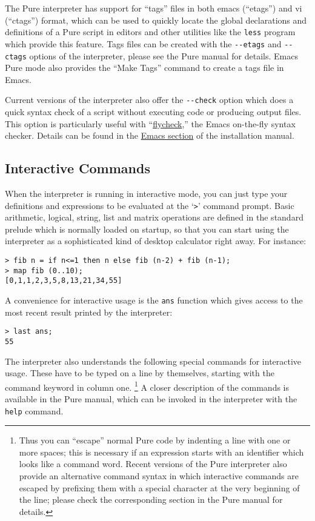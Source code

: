 \documentclass[a4paper,12pt]{article}
\begin{document}
The Pure interpreter has support for ``tags'' files in both emacs (``etags'') and vi (``ctags'') format, which can be used to quickly locate the global declarations and definitions of a Pure script in editors and other utilities like the \verb|less| program which provide this feature. Tags files can be created with the \verb|--etags| and \verb|--ctags| options of the interpreter, please see the Pure manual for details. Emacs Pure mode also provides the ``Make Tags'' command to create a tags file in Emacs.

Current versions of the interpreter also offer the \verb|--check| option which does a quick syntax check of a script without executing code or producing output files. This option is particularly useful with ``\href{http://www.flycheck.org/}{flycheck},'' the Emacs on-the-fly syntax checker. Details can be found in the \href{https://agraef.github.io/pure-docs/install.html#emacs-pure-mode}{Emacs section} of the installation manual.

\subsection{Interactive Commands}
\label{Interactive}

When the interpreter is running in interactive mode, you can just type your definitions and expressions to be evaluated at the `\verb|>|' command prompt. Basic arithmetic, logical, string, list and matrix operations are defined in the standard prelude which is normally loaded on startup, so that you can start using the interpreter as a sophisticated kind of desktop calculator right away. For instance:

\begin{lstlisting}
> fib n = if n<=1 then n else fib (n-2) + fib (n-1);
> map fib (0..10);
[0,1,1,2,3,5,8,13,21,34,55]
\end{lstlisting}

A convenience for interactive usage is the \verb|ans| function which gives access to the most recent result printed by the interpreter:

\begin{lstlisting}
> last ans;
55
\end{lstlisting}

The interpreter also understands the following special commands for interactive usage. These have to be typed on a line by themselves, starting with the command keyword in column one.%
\footnote{Thus you can ``escape'' normal Pure code by indenting a line with one or more spaces; this is necessary if an expression starts with an identifier which looks like a command word. Recent versions of the Pure interpreter also provide an alternative command syntax in which interactive commands are escaped by prefixing them with a special character at the very beginning of the line; please check the corresponding section in the Pure manual for details.} A closer description of the commands is available in the Pure manual, which can be invoked in the interpreter with the \verb|help| command.
\end{document}
